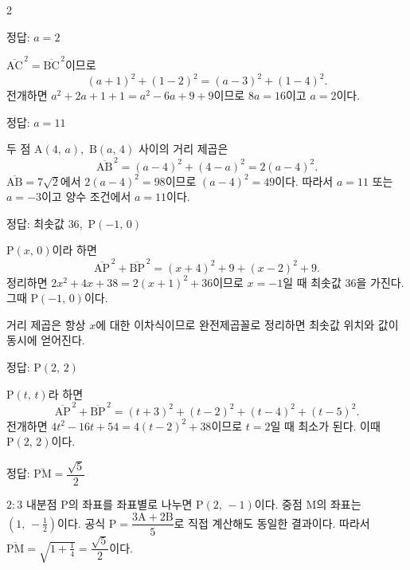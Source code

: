 \documentclass[10pt,fleqn,a4paper]{article}
\begin{document}
\begin{multicols*}{2}

\begin{dmanswerbox}정답: $a=2$\end{dmanswerbox}
$\overline{\mathrm{AC}}^{\,2}=\overline{\mathrm{BC}}^{\,2}$이므로
\[ (a+1)^2 + (1-2)^2 = (a-3)^2 + (1-4)^2. \]
전개하면 $a^2+2a+1+1 = a^2-6a+9+9$이므로 $8a=16$이고 $a=2$이다.

\begin{dmanswerbox}정답: $a=11$\end{dmanswerbox}
두 점 $\mathrm{A}(4,\,a)$,\ $\mathrm{B}(a,\,4)$ 사이의 거리 제곱은
\[ \overline{\mathrm{AB}}^{\,2} = (a-4)^2 + (4-a)^2 = 2(a-4)^2. \]
$\overline{\mathrm{AB}} = 7\sqrt{2}$에서 $2(a-4)^2 = 98$이므로 $(a-4)^2 = 49$이다.
따라서 $a=11$ 또는 $a=-3$이고 양수 조건에서 $a=11$이다.

\begin{dmanswerbox}정답: 최솟값 $36$,\ $\mathrm{P}(-1,\,0)$\end{dmanswerbox}
$\mathrm{P}(x,\,0)$이라 하면
\[ \overline{\mathrm{AP}}^{\,2}+\overline{\mathrm{BP}}^{\,2} = (x+4)^2+9 + (x-2)^2+9. \]
정리하면 $2x^2+4x+38 = 2(x+1)^2 + 36$이므로 $x=-1$일 때 최솟값 $36$을 가진다.
그때 $\mathrm{P}(-1,\,0)$이다.

\begin{dmcriticalpoint}
 거리 제곱은 항상 $x$에 대한 이차식이므로 완전제곱꼴로
정리하면 최솟값 위치와 값이 동시에 얻어진다.
\end{dmcriticalpoint}

\begin{dmanswerbox}정답: $\mathrm{P}(2,\,2)$\end{dmanswerbox}
$\mathrm{P}(t,\,t)$라 하면
\[ \overline{\mathrm{AP}}^{\,2}+\overline{\mathrm{BP}}^{\,2} = (t+3)^2+(t-2)^2 + (t-4)^2+(t-5)^2. \]
전개하면 $4t^2 - 16t + 54 = 4(t-2)^2 + 38$이므로 $t=2$일 때 최소가 된다.
이때 $\mathrm{P}(2,\,2)$이다.

\begin{dmanswerbox}정답: $\overline{\mathrm{PM}} = \dfrac{\sqrt{5}}{2}$\end{dmanswerbox}
$2 : 3$ 내분점 $\mathrm{P}$의 좌표를 좌표별로 나누면 $\mathrm{P}(2,\,-1)$이다.
중점 $\mathrm{M}$의 좌표는 $\left(1,\,-\tfrac{1}{2}\right)$이다.
\dmothersolution
공식 $\mathrm{P}=\dfrac{3\mathrm{A}+2\mathrm{B}}{5}$로 직접 계산해도 동일한 결과이다.
따라서 $\overline{\mathrm{PM}} = \sqrt{1+\tfrac{1}{4}} = \dfrac{\sqrt{5}}{2}$이다.

\end{multicols*}
\end{document}
